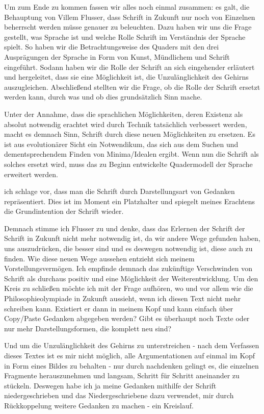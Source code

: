 \documentclass[12pt,a4paper,oneside]{article}
\begin{document}
  Um zum Ende zu kommen fassen wir alles noch einmal zusammen: es galt, die Behauptung von Villem Flusser, dass Schrift in Zukunft nur noch von Einzelnen beherrscht werden müsse genauer zu beleuchten. Dazu haben wir uns die Frage gestellt, was Sprache ist und welche Rolle Schrift im Verständnis der Sprache spielt. So haben wir die Betrachtungsweise des Quaders mit den drei Ausprägungen der Sprache in Form von Kunst, Mündlichem und Schrift eingeführt. Sodann haben wir die Rolle der Schrift an sich eingehender erläutert und hergeleitet, dass sie eine Möglichkeit ist, die Unzulänglichkeit des Gehirns auszugleichen. Abschließend stellten wir die Frage, ob die Rolle der Schrift ersetzt werden kann, durch was und ob dies grundsätzlich Sinn mache.
  
  Unter der Annahme, dass die sprachlichen Möglichkeiten, deren Existenz als absolut notwendig erachtet wird durch Technik tatsächlich verbessert werden, macht es demnach Sinn, Schrift durch diese neuen Möglichkeiten zu ersetzen. Es ist aus evolutionärer Sicht ein Notwendikum, das sich aus dem Suchen und dementsprechendem Finden von Minima/Idealen ergibt. Wenn nun die Schrift als solches ersetzt wird, muss das zu Beginn entwickelte Quadermodell der Sprache erweitert werden.
  
  ich schlage vor, dass man die Schrift durch Darstellungsart von Gedanken repräsentiert. Dies ist im Moment ein Platzhalter und spiegelt meines Erachtens die Grundintention der Schrift wieder.
  
  Demnach stimme ich Flusser zu und denke, dass das Erlernen der Schrift der Schrift in Zukunft nicht mehr notwendig ist, da wir andere Wege gefunden haben, uns auszudrücken, die besser sind und es deswegen notwendig ist, diese auch zu finden. Wie diese neuen Wege aussehen entzieht sich meinem Vorstellungsvermögen. Ich empfinde demnach das zukünftige Verschwinden von Schrift als durchaus positiv und eine Möglichkeit der Weiterentwicklung. Um den Kreis zu schließen möchte ich mit der Frage aufhören, wo und vor allem wie die Philosophieolympiade in Zukunft aussieht, wenn ich diesen Text nicht mehr schreiben kann. Existiert er dann in meinem Kopf und kann einfach über Copy/Paste Gedanken abgegeben werden? Gibt es überhaupt noch Texte oder nur mehr Darstellungsformen, die komplett neu sind?
  
  Und um die Unzulänglichkeit des Gehirns zu unterstreichen - nach dem Verfassen dieses Textes ist es mir nicht möglich, alle Argumentationen auf einmal im Kopf in Form eines Bildes zu behalten - nur durch nachdenken gelingt es, die einzelnen Fragmente herauszunehmen und langsam, Schritt für Schritt aneinander zu stückeln. Deswegen habe ich ja meine Gedanken mithilfe der Schrift niedergeschrieben und das Niedergeschriebene dazu verwendet, mir durch Rückkoppelung weitere Gedanken zu machen - ein Kreislauf.
  
\end{document}
